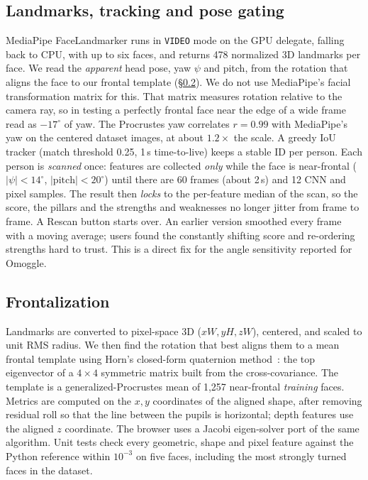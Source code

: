 \documentclass[sigconf,nonacm]{acmart}
\begin{document}
\subsection{Landmarks, tracking and pose gating}
MediaPipe FaceLandmarker runs in \texttt{VIDEO} mode on the GPU delegate, falling back to CPU, with up to
six faces, and returns 478 normalized 3D landmarks per face. We read the \emph{apparent} head pose, yaw
$\psi$ and pitch, from the rotation that aligns the face to our frontal template (\S\ref{sec:frontal}). We do not use
MediaPipe's facial transformation matrix for this. That matrix measures rotation relative to the camera ray, so
in testing a perfectly frontal face near the edge of a wide frame read as $-17^\circ$ of yaw. The Procrustes
yaw correlates $r=0.99$ with MediaPipe's yaw on the centered dataset images, at about $1.2\times$ the scale. A greedy IoU tracker (match threshold 0.25, 1\,s
time-to-live) keeps a stable ID per person. Each person is \emph{scanned} once: features are collected \emph{only} while the face is near-frontal
($|\psi|<14^\circ$, $|\text{pitch}|<20^\circ$) until there are 60 frames (about 2\,s) and 12 CNN and pixel
samples. The result then \emph{locks} to the per-feature median of the scan, so the score, the pillars and the
strengths and weaknesses no longer jitter from frame to frame. A Rescan button starts over. An earlier
version smoothed every frame with a moving average; users found the constantly shifting score and
re-ordering strengths hard to trust. This is a direct fix for the angle sensitivity reported for Omoggle.

\subsection{Frontalization}
\label{sec:frontal}
Landmarks are converted to pixel-space 3D ($x W, y H, z W$), centered, and scaled to unit RMS radius. We then
find the rotation that best aligns them to a mean frontal template using Horn's closed-form quaternion
method~\cite{horn1987closed}: the top eigenvector of a $4{\times}4$ symmetric matrix built from the
cross-covariance. The template is a generalized-Procrustes mean of 1,257 near-frontal \emph{training} faces.
Metrics are computed on the $x,y$ coordinates of the aligned shape, after removing residual roll so
that the line between the pupils is horizontal; depth features use the aligned $z$ coordinate. The browser uses a Jacobi eigen-solver port of the same
algorithm. Unit tests check every geometric, shape and pixel feature against the Python reference within
$10^{-3}$ on five faces, including the most strongly turned faces in the dataset.
\end{document}
